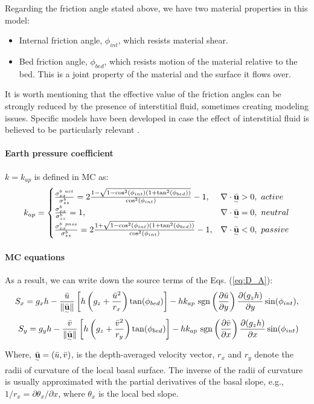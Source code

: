 \documentclass{article}
\begin{document}
Regarding the friction angle stated above, we have two material properties in this model:
\begin{itemize}
\item Internal friction angle, $\phi_{int}$, which resists material shear.
\item Bed friction angle, $\phi_{bed}$, which resists motion of the material relative to the bed. This is a joint property of the material and the surface it flows over.
\end{itemize}
It is worth mentioning that the effective value of the friction angles can be strongly reduced by the presence of interstitial fluid, sometimes creating modeling issues. Specific models have been developed in case the effect of interstitial fluid is believed to be particularly relevant \citep{PitmanLe2005}.

\paragraph{Earth pressure coefficient} $k=k_{ap}$ is defined in MC as:
\begin{eqnarray}\label{k_ap}
k_{ap} = \begin{cases}
\frac{\sigma_{xx}^{b \ act}}{\sigma_{zz}^b}=2\frac{1-\sqrt{1-\cos^2(\phi_{int})(1+\tan^2 (\phi_{bed}))}}{\cos^2(\phi_{int})}-1, & \nabla \cdot \underset{^\sim}{\bar{\textbf u}}>0, \ active\\
\frac{\sigma_{xx}^{b}}{\sigma_{zz}^b}=1, & \nabla \cdot \underset{^\sim}{\bar{\textbf u}}=0, \ neutral\\
\frac{\sigma_{xx}^{b \ pass}}{\sigma_{zz}^b}=2\frac{1+\sqrt{1-\cos^2(\phi_{int})(1+\tan^2 (\phi_{bed}))}}{\cos^2(\phi_{int})}-1, & \nabla \cdot \underset{^\sim}{\bar{\textbf u}}<0, \ passive
\end{cases}
\end{eqnarray}

\paragraph{MC equations} As a result, we can write down the source terms of the Eqs. (\ref{eq:D_A}):
\begin{eqnarray}\label{S_terms_MC}
S_x = g_x h  - \frac{\bar{u}}{\| \underset{^\sim}{\bar{\textbf u}} \|} \left[h\left(g_z+\frac{\bar{u}^2}{r_x}\right)\tan(\phi_{bed})\right] - h k_{ap} \ {\rm sgn}\left(\frac{\partial \bar{u}}{\partial y}\right) \frac{\partial (g_z h)}{\partial y} \sin(\phi_{int}),\nonumber \\
S_y = g_y h  - \frac{\bar{v}}{\| \underset{^\sim}{\bar{\textbf u}} \|} \left[h\left(g_z +\frac{\bar{v}^2}{r_y}\right)\tan(\phi_{bed})\right] - h k_{ap} \ {\rm sgn}\left({\frac{\partial \bar{v}}{\partial x}}\right) \frac{\partial (g_z h)}{\partial x} \sin(\phi_{int})
\end{eqnarray}
Where, $\underset{^\sim}{\bar{\textbf u}} = (\bar{u} , \bar{v})$, is the depth-averaged velocity vector, $r_x$ and $r_y$ denote the radii of curvature
of the local basal surface. The inverse of the radii of curvature is usually approximated with the partial derivatives of the basal slope, e.g., $1/r_x = \partial \theta_x/\partial x$, where $\theta_x$ is the local bed slope.
\end{document}
